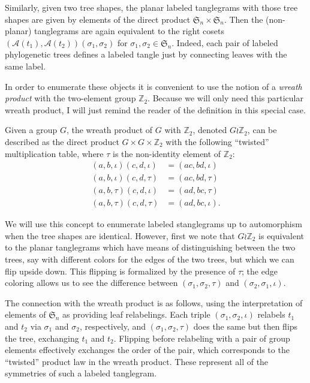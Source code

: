\documentclass{amsart}
\newcommand{\ZZ}{\mathbb Z}
\newcommand{\fS}{\mathfrak S}
\newcommand{\aut}{\mathcal A}
\newcommand{\id}{\iota}
\newcommand{\wrtwo}{\wr \ZZ_2}
\begin{document}
Similarly, given two tree shapes, the planar labeled tanglegrams with those tree shapes are given by elements of the direct product $\fS_n \times \fS_n$.
Then the (non-planar) tanglegrams are again equivalent to the right cosets $(\aut(t_1), \aut(t_2)) (\sigma_1, \sigma_2)$ for $\sigma_1, \sigma_2 \in \fS_n$.
Indeed, each pair of labeled phylogenetic trees defines a labeled tangle just by connecting leaves with the same label.

In order to enumerate these objects it is convenient to use the notion of a \emph{wreath product} with the two-element group $\ZZ_2$.
Because we will only need this particular wreath product, I will just remind the reader of the definition in this special case.

Given a group $G$, the wreath product of $G$ with $\ZZ_2$, denoted $G \wrtwo$, can be described as the direct product $G \times G \times \ZZ_2$ with the following ``twisted'' multiplication table, where $\tau$ is the non-identity element of $\ZZ_2$:
\begin{align*}
(a, b, \id) (c, d, \id) & = (ac, bd, \id) \\
(a, b, \id) (c, d, \tau) & = (ac, bd, \tau) \\
(a, b, \tau) (c, d, \id) & = (ad, bc, \tau) \\
(a, b, \tau) (c, d, \tau) & = (ad, bc, \id).
\end{align*}

We will use this concept to enumerate labeled stanglegrams up to automorphism when the tree shapes are identical.
However, first we note that $G \wrtwo$ is equivalent to the planar tanglegrams which have means of distinguishing between the two trees, say with different colors for the edges of the two trees, but which we can flip upside down.
This flipping is formalized by the presence of $\tau$; the edge coloring allows us to see the difference between $(\sigma_1, \sigma_2, \tau)$ and $(\sigma_2, \sigma_1, \id)$.

The connection with the wreath product is as follows, using the interpretation of elements of $\fS_n$ as providing leaf relabelings.
Each triple $(\sigma_1, \sigma_2, \id)$ relabels $t_1$ and $t_2$ via $\sigma_1$ and $\sigma_2$, respectively, and $(\sigma_1, \sigma_2, \tau)$ does the same but then flips the tree, exchanging $t_1$ and $t_2$.
Flipping before relabeling with a pair of group elements effectively exchanges the order of the pair, which corresponds to the ``twisted'' product law in the wreath product.
These represent all of the symmetries of such a labeled tanglegram.
\end{document}
